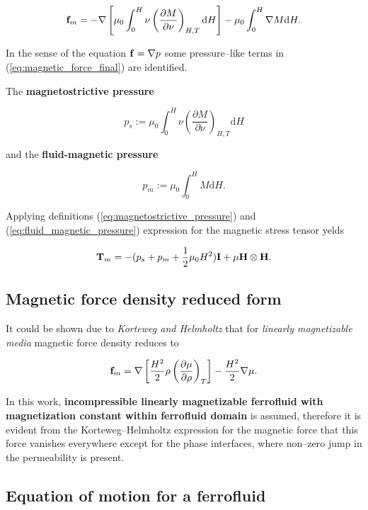 \begin{equation}
\mathbf{f}_m = - \nabla \left[ \mu_0 \int_0^H \nu \left( \frac{\partial M}{\partial \nu} \right)_{H, T} \mathrm{d}H \right] - \mu_0 \int_0^H \nabla M \mathrm{d}H.
\label{eq:magnetic_force_final}
\end{equation}

In the sense of the equation $\mathbf{f} = \nabla p$ some pressure--like terms in (\ref{eq:magnetic_force_final}) are identified.

The \textbf{magnetostrictive pressure}

\begin{equation}
p_s := \mu_0 \int_0^H \nu \left( \frac{\partial M} {\partial \nu} \right)_{H,T} \mathrm{d}H
\label{eq:magnetostrictive_pressure}
\end{equation}

and the \textbf{fluid-magnetic pressure}

\begin{equation}
p_m := \mu_0 \int_0^H M \mathrm{d}H.
\label{eq:fluid_magnetic_pressure}
\end{equation}

Applying definitions (\ref{eq:magnetostrictive_pressure}) and (\ref{eq:fluid_magnetic_pressure}) expression for the magnetic stress tensor yelds

$$ \mathbf{T}_m = -(p_s + p_m + \frac{1}{2} \mu_0 H^2 ) \mathbf{I} + \mu \mathbf{H} \otimes \mathbf{H}. $$

\subsection{Magnetic force density reduced form}

It could be shown due to \emph{Korteweg and Helmholtz} that for \emph{linearly magnetizable media} magnetic force density reduces to

$$ \mathbf{f}_m = \nabla \left[ \frac{H^2}{2} \rho \left( \frac{\partial \mu }{\partial \rho} \right)_{T} \right] - \frac{H^2}{2} \nabla \mu. $$

In this work, \textbf{incompressible linearly magnetizable ferrofluid with magnetization constant within ferrofluid domain} is assumed, therefore it is evident from the Korteweg--Helmholtz expression for the magnetic force that this force vanishes everywhere except for the phase interfaces, where non--zero jump in the permeability is present. 

\subsection{Equation of motion for a ferrofluid}

